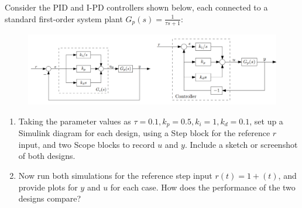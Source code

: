 \section{}


Consider the PID and I-PD controllers shown below, each connected to a standard
first-order system plant $G_p(s) = \frac{1}{\tau s + 1}$:
\begin{figure}[h]
    \centering
    \includegraphics[width=0.8\linewidth]{Questions/Figures/Q1ProblemDiagram.png}
\end{figure}
\begin{enumerate}[label=(\alph*)]
    \item Taking the parameter values as $\tau = 0.1, k_p = 0.5, k_i = 1, k_d = 0.1$, set up a Simulink diagram
    for each design, using a Step block for the reference $r$ input, and two Scope blocks to record
    $u$ and $y$. Include a sketch or screenshot of both designs.
    \item Now run both simulations for the reference step input $r(t) = 1+(t)$, and provide plots for $y$
    and $u$ for each case. How does the performance of the two designs compare?
\end{enumerate}

